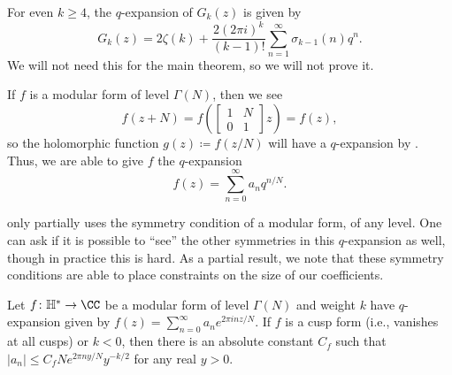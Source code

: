 \documentclass{amsart}
\begin{document}
\begin{example} \label{ex:gk-q-expansion}
	For even $k\ge4$, the $q$-expansion of $G_k(z)$ is given by
	\[G_k(z)=2\zeta(k)+\frac{2(2\pi i)^k}{(k-1)!}\sum_{n=1}^\infty\sigma_{k-1}(n)q^n.\]
	We will not need this for the main theorem, so we will not prove it.
\end{example}
\begin{remark}
	If $f$ is a modular form of level $\Gamma(N)$, then we see
	\[f(z+N)=f\left(\begin{bmatrix}
		1 & N \\
		0 & 1
	\end{bmatrix}z\right)=f(z),\]
	so the holomorphic function $g(z)\coloneqq f(z/N)$ will have a $q$-expansion by . Thus, we are able to give $f$ the $q$-expansion
	\[f(z)=\sum_{n=0}^\infty a_nq^{n/N}.\]
\end{remark}
 only partially uses the symmetry condition of a modular form, of any level. One can ask if it is possible to ``see'' the other symmetries in this $q$-expansion as well, though in practice this is hard. As a partial result, we note that these symmetry conditions are able to place constraints on the size of our coefficients.
\begin{proposition} \label{prop:coeff-bound}
	Let $f\colon\mathbb H^*\to\CC$ be a modular form of level $\Gamma(N)$ and weight $k$ have $q$-expansion given by $f(z)=\sum_{n=0}^\infty a_ne^{2\pi inz/N}$. If $f$ is a cusp form (i.e., vanishes at all cusps) or $k<0$, then there is an absolute constant $C_f$ such that $|a_n|\le C_fNe^{2\pi ny/N}y^{-k/2}$ for any real $y>0$.
\end{proposition}
\end{document}
